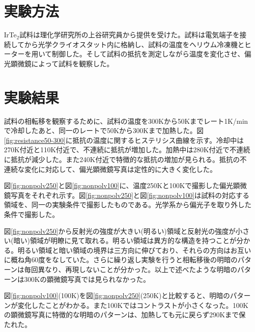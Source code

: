 \documentclass[11pt,a4paper]{jsarticle}
\begin{document}
\section{実験方法}
IrTe$_2$試料は理化学研究所の上谷研究員から提供を受けた。試料は電気端子を接続してから光学クライオスタット内に格納し、試料の温度をヘリウム冷凍機とヒーターを用いて制御した。そして試料の抵抗を測定しながら温度を変化させ、偏光顕微鏡によって試料を観察した。

\section{実験結果}
試料の相転移を観察するために、試料の温度を300Kから50Kまでレート1K/minで冷却したあと、同一のレートで50Kから300Kまで加熱した。図\ref{fig:resistance50-300}に抵抗の温度に関するヒステリシス曲線を示す。冷却中は270K付近と110K付近で、不連続に抵抗が増加した。加熱中は280K付近で不連続に抵抗が減少した。また240K付近で特徴的な抵抗の増加が見られる。抵抗の不連続な変化に対応して、偏光顕微鏡写真は定性的に大きく変化した。

図\ref{fig:nonpolv250}と図\ref{fig:nonpolv100}に、温度250Kと100Kで撮影した偏光顕微鏡写真をそれぞれ示す。図\ref{fig:nonpolv250}と図\ref{fig:nonpolv100}は試料の対応する領域を、同一の実験条件で撮影したものである。光学系から偏光子を取り外した条件で撮影した。

図\ref{fig:nonpolv250}から反射光の強度が大きい(明るい)領域と反射光の強度が小さい(暗い)領域が明瞭に見て取れる。明るい領域は異方的な構造を持つことが分かる。明るい領域と暗い領域の境界は三方向に伸びており、それらの方向はお互いに概ね角60度をなしていた。さらに繰り返し実験を行うと相転移後の明暗のパターンは毎回異なり、再現しないことが分かった。以上で述べたような明暗のパターンは300Kの顕微鏡写真では見られなかった。

図\ref{fig:nonpolv100}(100K)を図\ref{fig:nonpolv250}(250K)と比較すると、明暗のパターンが変化したことがわかる。また100Kではコントラストが小さくなった。100Kの顕微鏡写真に特徴的な明暗のパターンは、加熱しても元に戻らず290Kまで保たれた。
\end{document}
